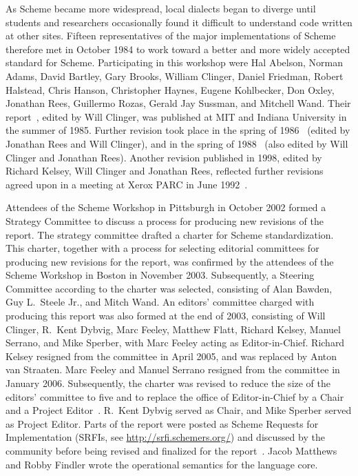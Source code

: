\documentclass[twoside,twocolumn]{algol60}
\begin{document}
\vest As Scheme became more widespread,
local dialects began to diverge until students and researchers
occasionally found it difficult to understand code written at other
sites.
Fifteen representatives of the major implementations of Scheme therefore
met in October 1984 to work toward a better and more widely accepted
standard for Scheme.
Participating in this workshop were Hal Abelson, Norman Adams, David
Bartley, Gary Brooks, William Clinger, Daniel Friedman, Robert Halstead,
Chris Hanson, Christopher Haynes, Eugene Kohlbecker, Don Oxley, Jonathan Rees,
Guillermo Rozas, Gerald Jay Sussman, and Mitchell Wand.
Their report~\cite{RRRS}, edited by Will Clinger,
was published at MIT and Indiana University in the summer of 1985.
Further revision took place in the spring of 1986~\cite{R3RS} (edited
by Jonathan Rees and Will Clinger),
and in the spring of 1988~\cite{R4RS} (also edited by Will Clinger and
Jonathan Rees).  Another revision published in 1998, edited
by Richard Kelsey, Will Clinger and Jonathan Rees,
reflected further revisions agreed upon in a meeting at Xerox PARC in
June 1992~\cite{R5RS}.

Attendees of the Scheme Workshop in Pittsburgh in October 2002 formed
a Strategy Committee to discuss a process for producing new revisions
of the report.  The strategy committee drafted a charter for Scheme
standardization.  This charter, together with a process for selecting
editorial committees for producing new revisions for the report, was
confirmed by the attendees of the Scheme Workshop in Boston in
November 2003.  Subsequently, a Steering Committee according to the
charter was selected, consisting of Alan Bawden, Guy L.\ Steele Jr.,
and Mitch Wand.  An editors' committee charged with producing this report was
also formed at the end of 2003, consisting of Will Clinger,
R.\ Kent Dybvig, Marc Feeley, Matthew Flatt, Richard Kelsey, Manuel
Serrano, and Mike Sperber, with Marc Feeley acting as Editor-in-Chief.
Richard Kelsey resigned from the committee in April 2005, and was
replaced by Anton van Straaten.  
Marc Feeley and Manuel Serrano
resigned from the committee in January 2006.  Subsequently, the charter
was revised to reduce the size of the editors' committee to five and
to replace the office of Editor-in-Chief by a Chair and a Project
Editor~\cite{SchemeCharter2006}.  R.\ Kent Dybvig served as Chair, and
Mike Sperber served as Project Editor.
Parts of the report were posted as Scheme Requests for Implementation
(SRFIs, see \url{http://srfi.schemers.org/})
and discussed by the community before being revised and finalized for
the report~\cite{srfi75,srfi76,srfi77,srfi83,srfi93}.
Jacob Matthews and Robby
Findler wrote the operational semantics for the language core.
\end{document}
